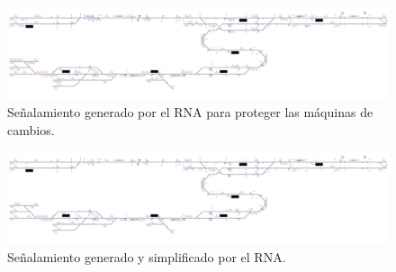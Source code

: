  \begin{figure}[H]
	\centering
	\includegraphics[width=1\textwidth]{resultados-obtenidos/ejemplo3/images/3_step4.png}
	\centering\caption{Señalamiento generado por el RNA para proteger las máquinas de cambios.}
\end{figure}

\lipsum[1]

 \begin{figure}[H]
	\centering
	\includegraphics[width=1\textwidth]{resultados-obtenidos/ejemplo3/images/3_RNA.png}
	\centering\caption{Señalamiento generado y simplificado por el RNA.}
\end{figure}

\lipsum[1]